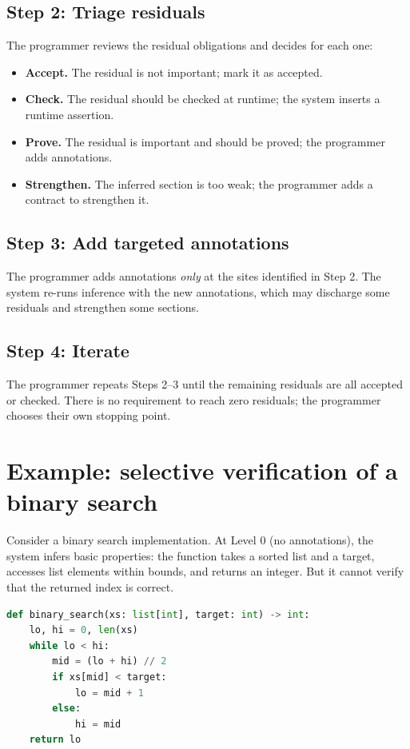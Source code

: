 \documentclass[11pt]{report}
\theoremstyle{definition}
\theoremstyle{plain}
\begin{document}
\subsection{Step 2: Triage residuals}

The programmer reviews the residual obligations and decides for each one:
\begin{itemize}[nosep]
  \item \textbf{Accept.} The residual is not important; mark it as accepted.
  \item \textbf{Check.} The residual should be checked at runtime; the system
        inserts a runtime assertion.
  \item \textbf{Prove.} The residual is important and should be proved; the
        programmer adds annotations.
  \item \textbf{Strengthen.} The inferred section is too weak; the programmer
        adds a contract to strengthen it.
\end{itemize}

\subsection{Step 3: Add targeted annotations}

The programmer adds annotations \emph{only} at the sites identified in
Step 2. The system re-runs inference with the new annotations, which may
discharge some residuals and strengthen some sections.

\subsection{Step 4: Iterate}

The programmer repeats Steps 2--3 until the remaining residuals are all
accepted or checked. There is no requirement to reach zero residuals; the
programmer chooses their own stopping point.

\section{Example: selective verification of a binary search}

Consider a binary search implementation. At Level 0 (no annotations), the
system infers basic properties: the function takes a sorted list and a
target, accesses list elements within bounds, and returns an integer. But it
cannot verify that the returned index is correct.

\begin{lstlisting}[style=deppy,language=Python]
def binary_search(xs: list[int], target: int) -> int:
    lo, hi = 0, len(xs)
    while lo < hi:
        mid = (lo + hi) // 2
        if xs[mid] < target:
            lo = mid + 1
        else:
            hi = mid
    return lo
\end{lstlisting}
\end{document}
